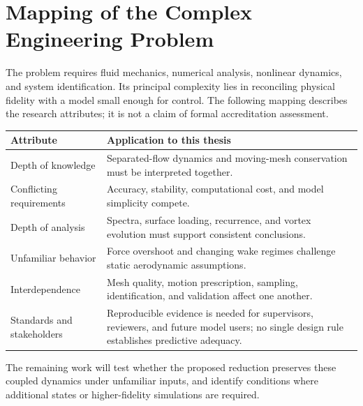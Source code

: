 \section{Mapping of the Complex Engineering Problem}
The problem requires fluid mechanics, numerical analysis, nonlinear dynamics, and system identification. Its principal complexity lies in reconciling physical fidelity with a model small enough for control. The following mapping describes the research attributes; it is not a claim of formal accreditation assessment.

\begin{center}\small
\begin{tabularx}{\linewidth}{@{}p{.27\linewidth}X@{}}
\toprule
Attribute & Application to this thesis \\
\midrule
Depth of knowledge & Separated-flow dynamics and moving-mesh conservation must be interpreted together. \\
Conflicting requirements & Accuracy, stability, computational cost, and model simplicity compete. \\
Depth of analysis & Spectra, surface loading, recurrence, and vortex evolution must support consistent conclusions. \\
Unfamiliar behavior & Force overshoot and changing wake regimes challenge static aerodynamic assumptions. \\
Interdependence & Mesh quality, motion prescription, sampling, identification, and validation affect one another. \\
Standards and stakeholders & Reproducible evidence is needed for supervisors, reviewers, and future model users; no single design rule establishes predictive adequacy. \\
\bottomrule
\end{tabularx}\end{center}

The remaining work will test whether the proposed reduction preserves these coupled dynamics under unfamiliar inputs, and identify conditions where additional states or higher-fidelity simulations are required.
